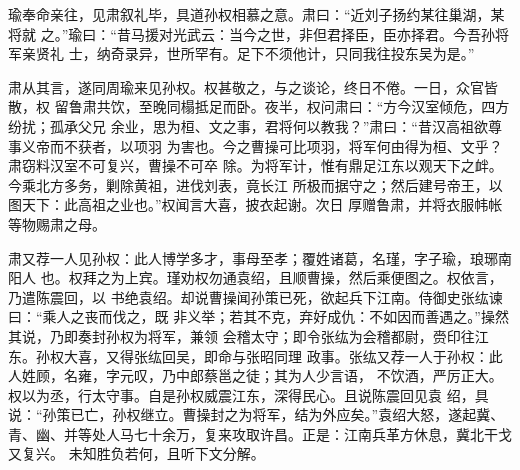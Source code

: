 瑜奉命亲往，见肃叙礼毕，具道孙权相慕之意。肃曰：“近刘子扬约某往巢湖，某将就
之。”瑜曰：“昔马援对光武云：当今之世，非但君择臣，臣亦择君。今吾孙将军亲贤礼
士，纳奇录异，世所罕有。足下不须他计，只同我往投东吴为是。”

肃从其言，遂同周瑜来见孙权。权甚敬之，与之谈论，终日不倦。一日，众官皆散，权
留鲁肃共饮，至晚同榻抵足而卧。夜半，权问肃曰：“方今汉室倾危，四方纷扰；孤承父兄
余业，思为桓、文之事，君将何以教我？”肃曰：“昔汉高祖欲尊事义帝而不获者，以项羽
为害也。今之曹操可比项羽，将军何由得为桓、文乎？肃窃料汉室不可复兴，曹操不可卒
除。为将军计，惟有鼎足江东以观天下之衅。今乘北方多务，剿除黄祖，进伐刘表，竟长江
所极而据守之；然后建号帝王，以图天下：此高祖之业也。”权闻言大喜，披衣起谢。次日
厚赠鲁肃，并将衣服帏帐等物赐肃之母。

肃又荐一人见孙权：此人博学多才，事母至孝；覆姓诸葛，名瑾，字子瑜，琅琊南阳人
也。权拜之为上宾。瑾劝权勿通袁绍，且顺曹操，然后乘便图之。权依言，乃遣陈震回，以
书绝袁绍。却说曹操闻孙策已死，欲起兵下江南。侍御史张纮谏曰：“乘人之丧而伐之，既
非义举；若其不克，弃好成仇：不如因而善遇之。”操然其说，乃即奏封孙权为将军，兼领
会稽太守；即令张纮为会稽都尉，赍印往江东。孙权大喜，又得张纮回吴，即命与张昭同理
政事。张纮又荐一人于孙权：此人姓顾，名雍，字元叹，乃中郎蔡邕之徒；其为人少言语，
不饮酒，严厉正大。权以为丞，行太守事。自是孙权威震江东，深得民心。且说陈震回见袁
绍，具说：“孙策已亡，孙权继立。曹操封之为将军，结为外应矣。”袁绍大怒，遂起冀、
青、幽、并等处人马七十余万，复来攻取许昌。正是：江南兵革方休息，冀北干戈又复兴。
未知胜负若何，且听下文分解。